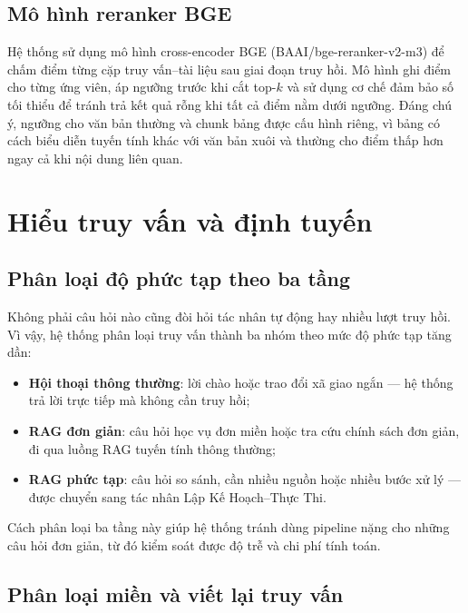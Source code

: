 \documentclass[../DoAn.tex]{subfiles}
\begin{document}
\subsection{Mô hình reranker BGE}

Hệ thống sử dụng mô hình cross-encoder BGE (BAAI/bge-reranker-v2-m3) để chấm
điểm từng cặp truy vấn--tài liệu sau giai đoạn truy hồi. Mô hình ghi điểm cho từng ứng viên, áp ngưỡng
trước khi cắt top-$k$ và sử dụng cơ chế đảm bảo số tối thiểu để tránh trả
kết quả rỗng khi tất cả điểm nằm dưới ngưỡng. Đáng chú ý, ngưỡng cho văn bản
thường và chunk bảng được cấu hình riêng, vì bảng có cách biểu diễn tuyến tính
khác với văn bản xuôi và thường cho điểm thấp hơn ngay cả khi nội dung liên
quan.

\section{Hiểu truy vấn và định tuyến}

\subsection{Phân loại độ phức tạp theo ba tầng}

Không phải câu hỏi nào cũng đòi hỏi tác nhân tự động hay nhiều lượt truy hồi.
Vì vậy, hệ thống phân loại truy vấn thành ba nhóm theo mức độ phức tạp tăng
dần:

\begin{itemize}
    \item \textbf{Hội thoại thông thường}: lời chào hoặc trao đổi xã giao
    ngắn --- hệ thống trả lời trực tiếp mà không cần truy hồi;
    \item \textbf{RAG đơn giản}: câu hỏi học vụ đơn miền hoặc tra cứu chính
    sách đơn giản, đi qua luồng RAG tuyến tính thông thường;
    \item \textbf{RAG phức tạp}: câu hỏi so sánh, cần nhiều nguồn hoặc nhiều
    bước xử lý --- được chuyển sang tác nhân Lập Kế Hoạch--Thực Thi.
\end{itemize}

Cách phân loại ba tầng này giúp hệ thống tránh dùng pipeline nặng cho những
câu hỏi đơn giản, từ đó kiểm soát được độ trễ và chi phí tính toán.

\subsection{Phân loại miền và viết lại truy vấn}
\end{document}
